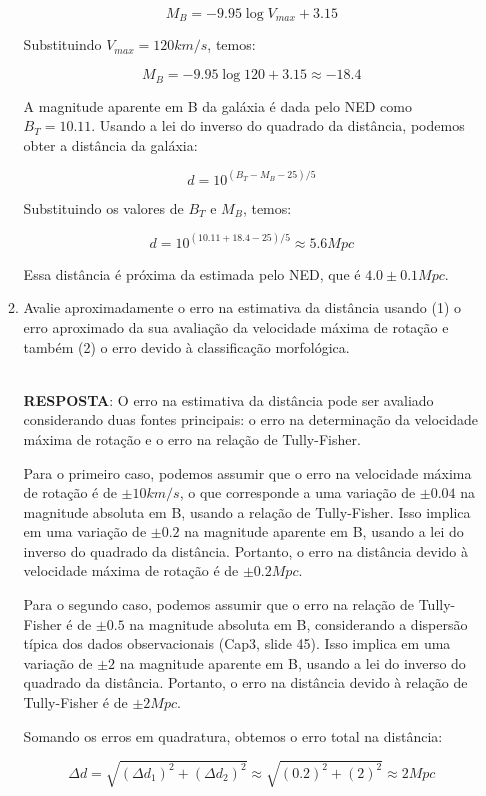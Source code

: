 \documentclass[a4paper,12pt]{article}
\begin{document}
\begin{enumerate}
\begin{enumerate}
$$M_B = -9.95 \log V_{max} + 3.15$$

Substituindo $V_{max} = 120 km/s$, temos:

$$M_B = -9.95 \log 120 + 3.15 \approx -18.4$$

A magnitude aparente em B da galáxia é dada pelo NED como $B_T = 10.11$. Usando a lei do inverso do quadrado da distância, podemos obter a distância da galáxia:

$$d = 10^{(B_T - M_B - 25)/5}$$

Substituindo os valores de $B_T$ e $M_B$, temos:

$$d = 10^{(10.11 + 18.4 - 25)/5} \approx 5.6 Mpc$$

Essa distância é próxima da estimada pelo NED, que é $4.0 \pm 0.1 Mpc$.

\noindent\hrulefill

\item Avalie aproximadamente o erro na estimativa da distância usando (1) o erro aproximado da sua avaliação da velocidade máxima de rotação e também (2) o erro devido à classificação morfológica.

\noindent\hrulefill\\\textbf{RESPOSTA}: O erro na estimativa da distância pode ser avaliado considerando duas fontes principais: o erro na determinação da velocidade máxima de rotação e o erro na relação de Tully-Fisher.

Para o primeiro caso, podemos assumir que o erro na velocidade máxima de rotação é de $\pm 10 km/s$, o que corresponde a uma variação de $\pm 0.04$ na magnitude absoluta em B, usando a relação de Tully-Fisher. Isso implica em uma variação de $\pm 0.2$ na magnitude aparente em B, usando a lei do inverso do quadrado da distância. Portanto, o erro na distância devido à velocidade máxima de rotação é de $\pm 0.2 Mpc$.

Para o segundo caso, podemos assumir que o erro na relação de Tully-Fisher é de $\pm 0.5$ na magnitude absoluta em B, considerando a dispersão típica dos dados observacionais (Cap3, slide 45). Isso implica em uma variação de $\pm 2$ na magnitude aparente em B, usando a lei do inverso do quadrado da distância. Portanto, o erro na distância devido à relação de Tully-Fisher é de $\pm 2 Mpc$.

Somando os erros em quadratura, obtemos o erro total na distância:

$$\Delta d = \sqrt{(\Delta d_1)^2 + (\Delta d_2)^2} \approx \sqrt{(0.2)^2 + (2)^2} \approx 2 Mpc$$

\noindent\hrulefill


\end{enumerate}
\end{enumerate}
\end{document}
